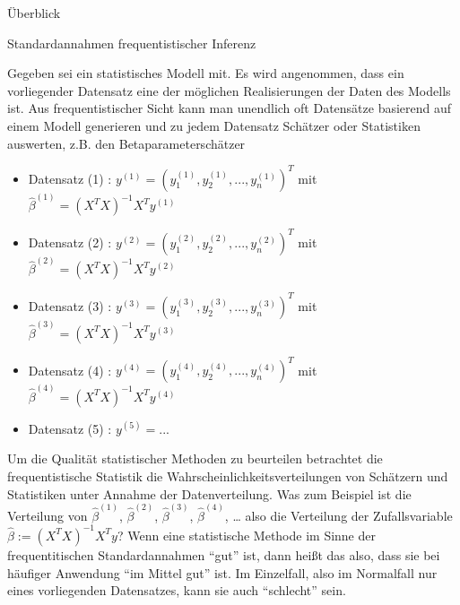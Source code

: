 \documentclass[
  8pt,
  ignorenonframetext,
]{beamer}
\begin{document}
\begin{frame}{Überblick}
\protect\hypertarget{uxfcberblick-5}{}
\small

Standardannahmen frequentistischer Inferenz

\footnotesize
{}

Gegeben sei ein statistisches Modell mit. Es wird angenommen, dass ein
vorliegender Datensatz eine der möglichen Realisierungen der Daten des
Modells ist. Aus frequentistischer Sicht kann man unendlich oft
Datensätze basierend auf einem Modell generieren und zu jedem Datensatz
Schätzer oder Statistiken auswerten, z.B. den Betaparameterschätzer
\vspace{1mm}

\begin{itemize}
\item[] Datensatz (1) : $y^{(1)} = \left(y_1^{(1)}, y_2^{(1)}, ...,y_n^{(1)}\right)^T$  mit $\hat{\beta}^{(1)} = (X^TX)^{-1}X^Ty^{(1)}$
\item[] Datensatz (2) : $y^{(2)} = \left(y_1^{(2)}, y_2^{(2)}, ...,y_n^{(2)}\right)^T$  mit $\hat{\beta}^{(2)} = (X^TX)^{-1}X^Ty^{(2)}$
\item[] Datensatz (3) : $y^{(3)} = \left(y_1^{(3)}, y_2^{(3)}, ...,y_n^{(3)}\right)^T$  mit $\hat{\beta}^{(3)} = (X^TX)^{-1}X^Ty^{(3)}$
\item[] Datensatz (4) : $y^{(4)} = \left(y_1^{(4)}, y_2^{(4)}, ...,y_n^{(4)}\right)^T$  mit $\hat{\beta}^{(4)} = (X^TX)^{-1}X^Ty^{(4)}$
\item[] Datensatz (5) : $y^{(5)} = ...$
\end{itemize}

\vspace{1mm}

Um die Qualität statistischer Methoden zu beurteilen betrachtet die
frequentistische Statistik die Wahrscheinlichkeitsverteilungen von
Schätzern und Statistiken unter Annahme der Datenverteilung. Was zum
Beispiel ist die Verteilung von \(\hat{\beta}^{(1)}\),
\(\hat{\beta}^{(2)}\), \(\hat{\beta}^{(3)}\), \(\hat{\beta}^{(4)}\),
\ldots{} also die Verteilung der Zufallsvariable
\(\hat{\beta} := (X^TX)^{-1}X^Ty\)? Wenn eine statistische Methode im
Sinne der frequentitischen Standardannahmen ``gut'' ist, dann heißt das
also, dass sie bei häufiger Anwendung ``im Mittel gut'' ist. Im
Einzelfall, also im Normalfall nur eines vorliegenden Datensatzes, kann
sie auch ``schlecht'' sein.
\end{frame}
\end{document}
